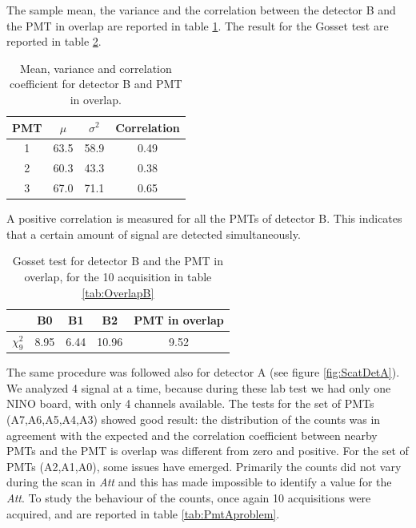 The sample mean, the variance and the correlation between the detector B and the PMT in overlap are reported in table \ref{tab:ResultBB}. The result for the Gosset test are reported in table \ref{tab:GossetForOver}.

\begin{table}[ht]
\centering
\begin{tabular}{c|c|c|c}
\hline 
PMT & $\mu$ & $\sigma^{2}$ & Correlation \\
\hline
1 	& 63.5	& 58.9	& 0.49 \\
2 	& 60.3	& 43.3	& 0.38 \\
3	& 67.0	& 71.1  & 0.65 \\
\hline
\end{tabular}
\caption{Mean, variance and correlation coefficient for detector B and PMT in overlap.}
\label{tab:ResultBB}
\end{table}

A positive correlation is measured for all the PMTs of detector B. This indicates that a certain amount of signal are detected simultaneously.

\begingroup
\setlength{\tabcolsep}{8pt} %
\renewcommand{\arraystretch}{1.2} %
\begin{table}[ht]
\centering
\begin{tabular}{c|c|c|c|c}
\hline 
   & B0 & B1 & B2 & PMT in overlap \\ 
\hline
$\chi^{2}_{9}$ & 8.95 & 6.44 & 10.96 & 9.52\\ 
\hline
\end{tabular}
\caption{Gosset test for detector B and the PMT in overlap, for the 10 acquisition in table \ref{tab:OverlapB}}
\label{tab:GossetForOver}
\end{table}
\endgroup

The same procedure was followed also for detector A (see figure \ref{fig:ScatDetA}). We analyzed 4 signal at a time, because during these lab test we had only one NINO board, with only 4 channels available. The tests for the set of PMTs (A7,A6,A5,A4,A3) showed good result: the distribution of the counts was in agreement with the expected and the correlation coefficient between nearby PMTs and the PMT is overlap was different from zero and positive. For the set of PMTs (A2,A1,A0), some issues have emerged. Primarily the counts did not vary during the scan in \textit{Att} and this has made impossible to identify a value for the \textit{Att}. To study the behaviour of the counts, once again 10 acquisitions were acquired, and are reported in table \ref{tab:PmtAproblem}. \newpage

